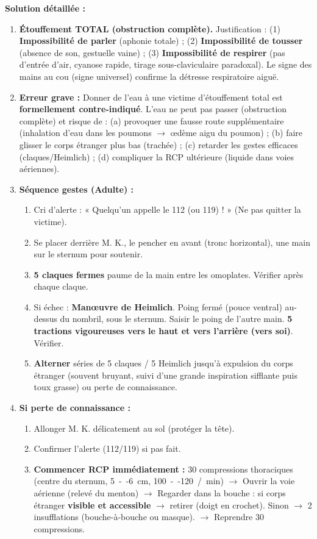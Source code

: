 \documentclass[11pt]{article}
\begin{document}
\begin{exoresolu}
\tcblower
\textbf{Solution détaillée :}
\begin{enumerate}
    \item \textbf{Étouffement TOTAL (obstruction complète).} Justification : (1) \textbf{Impossibilité de parler} (aphonie totale) ; (2) \textbf{Impossibilité de tousser} (absence de son, gestuelle vaine) ; (3) \textbf{Impossibilité de respirer} (pas d'entrée d'air, cyanose rapide, tirage sous-claviculaire paradoxal). Le signe des mains au cou (signe universel) confirme la détresse respiratoire aiguë.
    \item \textbf{Erreur grave :} Donner de l'eau à une victime d'étouffement total est \textbf{formellement contre-indiqué}. L'eau ne peut pas passer (obstruction complète) et risque de : (a) provoquer une fausse route supplémentaire (inhalation d'eau dans les poumons $\to$ œdème aigu du poumon) ; (b) faire glisser le corps étranger plus bas (trachée) ; (c) retarder les gestes efficaces (claques/Heimlich) ; (d) compliquer la RCP ultérieure (liquide dans voies aériennes).
    \item \textbf{Séquence gestes (Adulte) :}
    \begin{enumerate}
        \item Cri d'alerte : « Quelqu'un appelle le 112 (ou 119) ! » (Ne pas quitter la victime).
        \item Se placer derrière M. K., le pencher en avant (tronc horizontal), une main sur le sternum pour soutenir.
        \item \textbf{5 claques fermes} paume de la main entre les omoplates. Vérifier après chaque claque.
        \item Si échec : \textbf{Manœuvre de Heimlich}. Poing fermé (pouce ventral) au-dessus du nombril, sous le sternum. Saisir le poing de l'autre main. \textbf{5 tractions vigoureuses vers le haut et vers l'arrière (vers soi)}. Vérifier.
        \item \textbf{Alterner} séries de 5 claques / 5 Heimlich jusqu'à expulsion du corps étranger (souvent bruyant, suivi d'une grande inspiration sifflante puis toux grasse) ou perte de connaissance.
    \end{enumerate}
    \item \textbf{Si perte de connaissance :}
    \begin{enumerate}
        \item Allonger M. K. délicatement au sol (protéger la tête).
        \item Confirmer l'alerte (112/119) si pas fait.
        \item \textbf{Commencer RCP immédiatement :} 30 compressions thoraciques (centre du sternum, \SI{5}{--}\SI{6}{cm}, \SI{100}{--}\SI{120}{/min}) $\to$ Ouvrir la voie aérienne (relevé du menton) $\to$ Regarder dans la bouche : si corps étranger \textbf{visible et accessible} $\to$ retirer (doigt en crochet). Sinon $\to$ 2 insufflations (bouche-à-bouche ou masque). $\to$ Reprendre 30 compressions.

\end{enumerate}
\end{enumerate}
\end{exoresolu}
\end{document}
